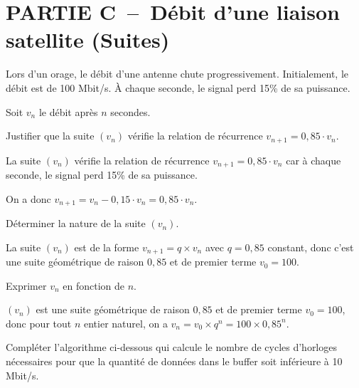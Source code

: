 \pagebreak

\thispagestyle{DS_LP}

\section*{PARTIE C~--~Débit d'une liaison satellite (Suites)}

Lors d'un orage, le débit d'une antenne chute progressivement. Initialement, le débit est de 100 Mbit/s. À chaque seconde, le signal perd 15\% de sa puissance.

Soit $v_n$ le débit après $n$ secondes.


\begin{enumerate}[series=monDS, resume]
    \item Justifier que la suite $(v_n)$ vérifie la relation de récurrence $v_{n+1}=0,85\cdot v_n$.
    \begin{blocvisiblex}[height=3.5]
    {\quad}
    La suite $(v_n)$ vérifie la relation de récurrence $v_{n+1}=0,85\cdot v_n$ car à chaque seconde, le signal perd 15\% de sa puissance.

    On a donc $v_{n+1}=v_n-0,15\cdot v_n=0,85\cdot v_n$.

    \end{blocvisiblex}
    \medskip
    \item Déterminer la nature de la suite $(v_n)$. 
    \begin{blocvisiblex}[height=2]
    {\quad}

    La suite $(v_n)$ est de la forme $v_{n+1}=q \times v_n$ avec $q=0,85$ constant, donc c'est une suite géométrique de raison $0,85$ et de premier terme $v_0=100$.
    \end{blocvisiblex}
    \medskip
    \item Exprimer $v_n$ en fonction de $n$. 
    \begin{blocvisiblex}[height=2]
    {\quad}
    $(v_n)$ est une suite géométrique de raison $0,85$ et de premier terme $v_0=100$, donc pour tout $n$ entier naturel, on a $v_n=v_0 \times q^n=100 \times 0,85^n$.
    \end{blocvisiblex}
    \medskip
    \begin{minipage}{0.45\textwidth}
    \item Compléter l'algorithme ci-dessous qui calcule le nombre de cycles d'horloges nécessaires pour que la quantité de données dans le buffer soit inférieure à 10 Mbit/s.


\end{minipage}
\end{enumerate}

